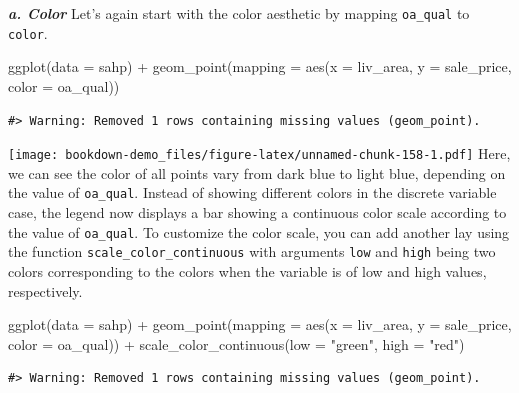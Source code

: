 \documentclass[
]{book}
\newenvironment{Shaded}{\begin{snugshade}}{\end{snugshade}}
\newcommand{\AttributeTok}[1]{\textcolor[rgb]{0.77,0.63,0.00}{#1}}
\newcommand{\FunctionTok}[1]{\textcolor[rgb]{0.00,0.00,0.00}{#1}}
\newcommand{\NormalTok}[1]{#1}
\newcommand{\SpecialCharTok}[1]{\textcolor[rgb]{0.00,0.00,0.00}{#1}}
\newcommand{\StringTok}[1]{\textcolor[rgb]{0.31,0.60,0.02}{#1}}
\begin{document}
\textbf{\emph{a. Color}}
Let's again start with the color aesthetic by mapping \texttt{oa\_qual} to \texttt{color}.

\begin{Shaded}
\begin{Highlighting}[]
\FunctionTok{ggplot}\NormalTok{(}\AttributeTok{data =}\NormalTok{ sahp) }\SpecialCharTok{+} \FunctionTok{geom\_point}\NormalTok{(}\AttributeTok{mapping =} \FunctionTok{aes}\NormalTok{(}\AttributeTok{x =}\NormalTok{ liv\_area, }\AttributeTok{y =}\NormalTok{ sale\_price, }\AttributeTok{color =}\NormalTok{ oa\_qual))}
\end{Highlighting}
\end{Shaded}

\begin{verbatim}
#> Warning: Removed 1 rows containing missing values (geom_point).
\end{verbatim}

\texttt{[image: bookdown-demo\_files/figure-latex/unnamed-chunk-158-1.pdf]}
Here, we can see the color of all points vary from dark blue to light blue, depending on the value of \texttt{oa\_qual}. Instead of showing different colors in the discrete variable case, the legend now displays a bar showing a continuous color scale according to the value of \texttt{oa\_qual}. To customize the color scale, you can add another lay using the function \texttt{scale\_color\_continuous} with arguments \texttt{low} and \texttt{high} being two colors corresponding to the colors when the variable is of low and high values, respectively.

\begin{Shaded}
\begin{Highlighting}[]
\FunctionTok{ggplot}\NormalTok{(}\AttributeTok{data =}\NormalTok{ sahp) }\SpecialCharTok{+} \FunctionTok{geom\_point}\NormalTok{(}\AttributeTok{mapping =} \FunctionTok{aes}\NormalTok{(}\AttributeTok{x =}\NormalTok{ liv\_area, }\AttributeTok{y =}\NormalTok{ sale\_price, }\AttributeTok{color =}\NormalTok{ oa\_qual)) }\SpecialCharTok{+} \FunctionTok{scale\_color\_continuous}\NormalTok{(}\AttributeTok{low =} \StringTok{"green"}\NormalTok{, }\AttributeTok{high =} \StringTok{"red"}\NormalTok{)}
\end{Highlighting}
\end{Shaded}

\begin{verbatim}
#> Warning: Removed 1 rows containing missing values (geom_point).
\end{verbatim}
\end{document}
